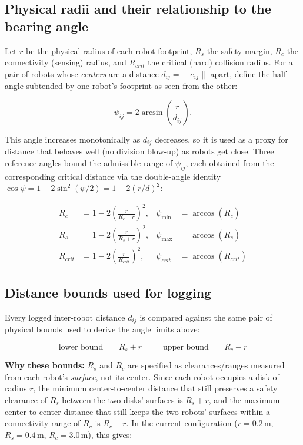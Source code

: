\documentclass[11pt]{article}
\begin{document}
\subsection{Physical radii and their relationship to the bearing angle}

Let $r$ be the physical radius of each robot footprint, $R_s$ the safety
margin, $R_c$ the connectivity (sensing) radius, and $R_{crit}$ the critical
(hard) collision radius. For a pair of robots whose \emph{centers} are a
distance $d_{ij} = \lVert e_{ij}\rVert$ apart, define the half-angle subtended
by one robot's footprint as seen from the other:

\begin{equation}
    \psi_{ij} = 2 \arcsin\!\left(\frac{r}{d_{ij}}\right).
\end{equation}

This angle increases monotonically as $d_{ij}$ decreases, so it is used as a
proxy for distance that behaves well (no division blow-up) as robots get
close. Three reference angles bound the admissible range of $\psi_{ij}$,
each obtained from the corresponding critical distance via the double-angle
identity $\cos\psi = 1 - 2\sin^2(\psi/2) = 1-2(r/d)^2$:

\begin{align}
    \bar{R}_c &= 1 - 2\left(\frac{r}{R_c - r}\right)^2,
    &\psi_{\min} &= \arccos(\bar{R}_c) \\
    \bar{R}_s &= 1 - 2\left(\frac{r}{R_s + r}\right)^2,
    &\psi_{\max} &= \arccos(\bar{R}_s) \\
    \bar{R}_{crit} &= 1 - 2\left(\frac{r}{R_{crit}}\right)^2,
    &\psi_{crit} &= \arccos(\bar{R}_{crit})
\end{align}

\subsection{Distance bounds used for logging}

Every logged inter-robot distance $d_{ij}$ is compared against the same pair
of physical bounds used to derive the angle limits above:

\begin{equation}
    \boxed{\;\text{lower bound} \;=\; R_s + r\;} \qquad
    \boxed{\;\text{upper bound} \;=\; R_c - r\;}
\end{equation}

\textbf{Why these bounds:} $R_s$ and $R_c$ are specified as clearances/ranges
measured from each robot's \emph{surface}, not its center. Since each robot
occupies a disk of radius $r$, the minimum center-to-center distance that
still preserves a safety clearance of $R_s$ between the two disks' surfaces is
$R_s + r$, and the maximum center-to-center distance that still keeps the two
robots' surfaces within a connectivity range of $R_c$ is $R_c - r$. In the
current configuration ($r = 0.2\,\text{m}$, $R_s = 0.4\,\text{m}$,
$R_c = 3.0\,\text{m}$), this gives:
\end{document}
